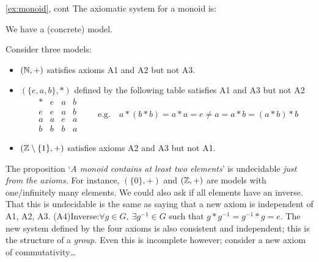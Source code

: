 \begin{example*}{\ref{ex:monoid}, cont}{}
	The axiomatic system for a monoid is:
	\begin{description}\itemsep0pt
		\item[\normalfont\emph{Consistent}] We have a (concrete) model.
		\item[\normalfont\emph{Independent}] Consider three models:
		\begin{itemize}\itemsep0pt
		  \item $(\mathbb{N},+)$ satisfies axioms A1 and A2 but not A3.
		  \item $(\{e,a,b\},*)$ defined by the following table satisfies A1 and A3 but not A2
		  \[
		  	\begin{array}{c||ccc}
		  		*&e&a&b\\\hline\hline
		  		e&e&a&b\\
		  		a&a&e&a\\
		  		b&b&b&a
		  	\end{array}
		  	\qquad \text{e.g.}\quad 
		  	a*(b*b)=a*a=e\neq a=a*b=(a*b)*b
		  	\]
		  \item $(\mathbb{Z}\setminus\{1\},+)$ satisfies axioms A2 and A3 but not A1.
		\end{itemize}
		\item[\normalfont\emph{Incomplete}] The proposition `\emph{A monoid contains at least two elements}' is undecidable \emph{just from the axioms.} For instance, $(\{0\},+)$ and $(\mathbb{Z},+)$ are models with one/infinitely many elements.\smallbreak
		  We could also ask if all elements have an inverse. That this is undecidable is the same as saying that a new axiom is independent of A1, A2, A3.\smallbreak
		  \lstsp\lstsp\lstsp(A4)\lstsp Inverse:\quad $\forall g\in G,\ \exists g^{-1}\in G$ such that $g\ast g^{-1}=g^{-1}\ast g=e$.\smallbreak
		The new system defined by the four axioms is also consistent and independent; this is the structure of a \emph{group.} Even this is incomplete however; consider a new axiom of commutativity\ldots
	\end{description} 
\end{example*}


\goodbreak


